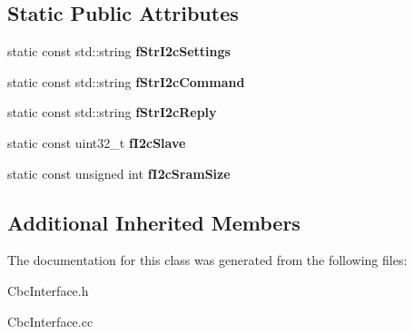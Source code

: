 \subsection*{Static Public Attributes}
\begin{DoxyCompactItemize}
\item 
\hypertarget{class_ph2___hw_interface_1_1_c_b_c_interface_a3e1a76026b451e23697eb1eecdf8c912}{static const std\-::string {\bfseries f\-Str\-I2c\-Settings}}\label{class_ph2___hw_interface_1_1_c_b_c_interface_a3e1a76026b451e23697eb1eecdf8c912}

\item 
\hypertarget{class_ph2___hw_interface_1_1_c_b_c_interface_a2c72e9920d45e1df938f582a095196d4}{static const std\-::string {\bfseries f\-Str\-I2c\-Command}}\label{class_ph2___hw_interface_1_1_c_b_c_interface_a2c72e9920d45e1df938f582a095196d4}

\item 
\hypertarget{class_ph2___hw_interface_1_1_c_b_c_interface_a583ceda969e6d70c981cad62af51f567}{static const std\-::string {\bfseries f\-Str\-I2c\-Reply}}\label{class_ph2___hw_interface_1_1_c_b_c_interface_a583ceda969e6d70c981cad62af51f567}

\item 
\hypertarget{class_ph2___hw_interface_1_1_c_b_c_interface_a5222dcc6e69a64dcef874d622136e994}{static const uint32\-\_\-t {\bfseries f\-I2c\-Slave}}\label{class_ph2___hw_interface_1_1_c_b_c_interface_a5222dcc6e69a64dcef874d622136e994}

\item 
\hypertarget{class_ph2___hw_interface_1_1_c_b_c_interface_a56e4c064a6bab7a595daff2497c73ad4}{static const unsigned int {\bfseries f\-I2c\-Sram\-Size}}\label{class_ph2___hw_interface_1_1_c_b_c_interface_a56e4c064a6bab7a595daff2497c73ad4}

\end{DoxyCompactItemize}
\subsection*{Additional Inherited Members}


The documentation for this class was generated from the following files\-:\begin{DoxyCompactItemize}
\item 
Cbc\-Interface.\-h\item 
Cbc\-Interface.\-cc\end{DoxyCompactItemize}
